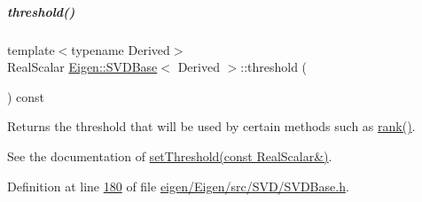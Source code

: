 \mbox{\label{group___s_v_d___module_a98b2ee98690358951807353812a05c69}} 
\subparagraph{\texorpdfstring{threshold()}{threshold()}\hspace{0.1cm}{\footnotesize\ttfamily [2/2]}}
{\footnotesize\ttfamily template$<$typename Derived$>$ \\
Real\+Scalar \hyperlink{group___s_v_d___module_class_eigen_1_1_s_v_d_base}{Eigen\+::\+S\+V\+D\+Base}$<$ Derived $>$\+::threshold (\begin{DoxyParamCaption}{ }\end{DoxyParamCaption}) const\hspace{0.3cm}{\ttfamily [inline]}}

Returns the threshold that will be used by certain methods such as \hyperlink{group___s_v_d___module_a30b89e24f42f1692079eea31b361d26a}{rank()}.

See the documentation of \hyperlink{group___s_v_d___module_a1c95d05398fc15e410a28560ef70a5a6}{set\+Threshold(const Real\+Scalar\&)}. 

Definition at line \hyperlink{eigen_2_eigen_2src_2_s_v_d_2_s_v_d_base_8h_source_l00180}{180} of file \hyperlink{eigen_2_eigen_2src_2_s_v_d_2_s_v_d_base_8h_source}{eigen/\+Eigen/src/\+S\+V\+D/\+S\+V\+D\+Base.\+h}.

